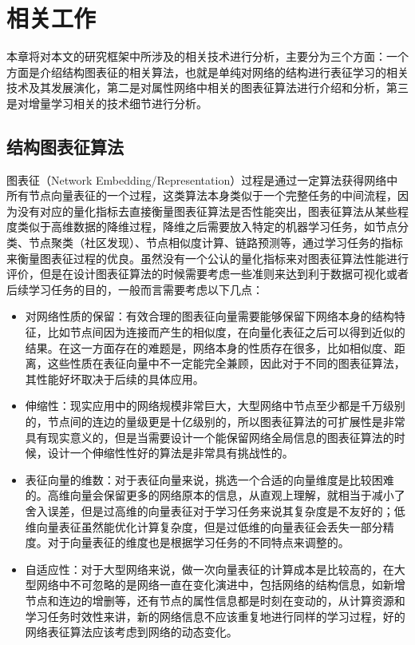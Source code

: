 \chapter{相关工作}
本章将对本文的研究框架中所涉及的相关技术进行分析，主要分为三个方面：一个方面是介绍结构图表征的相关算法，也就是单纯对网络的结构进行表征学习的相关技术及其发展演化，第二是对属性网络中相关的图表征算法进行介绍和分析，第三是对增量学习相关的技术细节进行分析。



\section{结构图表征算法}
图表征（Network Embedding/Representation）过程是通过一定算法获得网络中所有节点向量表征的一个过程，这类算法本身类似于一个完整任务的中间流程，因为没有对应的量化指标去直接衡量图表征算法是否性能突出，图表征算法从某些程度类似于高维数据的降维过程，降维之后需要放入特定的机器学习任务，如节点分类、节点聚类（社区发现）、节点相似度计算、链路预测等，通过学习任务的指标来衡量图表征过程的优良。虽然没有一个公认的量化指标来对图表征算法性能进行评价\cite{goyal2017graph}，但是在设计图表征算法的时候需要考虑一些准则来达到利于数据可视化或者后续学习任务的目的，一般而言需要考虑以下几点：
\begin{itemize}
	\item { 对网络性质的保留：有效合理的图表征向量需要能够保留下网络本身的结构特征，比如节点间因为连接而产生的相似度，在向量化表征之后可以得到近似的结果。在这一方面存在的难题是，网络本身的性质存在很多，比如相似度、距离，这些性质在表征向量中不一定能完全兼顾，因此对于不同的图表征算法，其性能好坏取决于后续的具体应用。}
	\item {伸缩性：现实应用中的网络规模非常巨大，大型网络中节点至少都是千万级别的，节点间的连边的量级更是十亿级别的，所以图表征算法的可扩展性是非常具有现实意义的，但是当需要设计一个能保留网络全局信息的图表征算法的时候，设计一个伸缩性性好的算法是非常具有挑战性的。}
	\item {表征向量的维数：对于表征向量来说，挑选一个合适的向量维度是比较困难的。高维向量会保留更多的网络原本的信息，从直观上理解，就相当于减小了舍入误差，但是过高维的向量表征对于学习任务来说其复杂度是不友好的；低维向量表征虽然能优化计算复杂度，但是过低维的向量表征会丢失一部分精度。对于向量表征的维度也是根据学习任务的不同特点来调整的。}
	\item {自适应性：对于大型网络来说，做一次向量表征的计算成本是比较高的，在大型网络中不可忽略的是网络一直在变化演进中，包括网络的结构信息，如新增节点和连边的增删等，还有节点的属性信息都是时刻在变动的，从计算资源和学习任务时效性来讲，新的网络信息不应该重复地进行同样的学习过程，好的网络表征算法应该考虑到网络的动态变化。}
\end{itemize}

